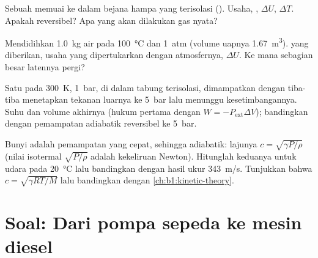 \begin{exercise}[$\star\star$]\label{exo:b1:first-law:9}
Sebuah  memuai ke dalam bejana hampa yang terisolasi (). Usaha, , $\Delta U$, $\Delta T$. Apakah 
reversibel? Apa yang akan dilakukan gas nyata?
\end{exercise}

\begin{exercise}[$\star\star\star$]\label{exo:b1:first-law:10}
Mendidihkan \qty{1.0}{kg} air pada \qty{100}{\degreeCelsius} dan \qty{1}{atm}
(volume uapnya \qty{1.67}{m^3}).  yang diberikan, usaha yang dipertukarkan dengan
atmosfernya, $\Delta U$. Ke mana sebagian besar  latennya pergi?
\end{exercise}

\begin{exercise}[$\star\star\star$]\label{exo:b1:first-law:11}
Satu   pada \qty{300}{K}, \qty{1}{bar}, di dalam tabung
terisolasi, dimampatkan dengan tiba-tiba menetapkan tekanan luarnya ke
\qty{5}{bar} lalu menunggu kesetimbangannya. Suhu dan volume akhirnya
(hukum pertama dengan $W = -P_{\mathrm{ext}}\Delta V$); bandingkan dengan pemampatan
adiabatik reversibel ke \qty{5}{bar}.
\end{exercise}

\begin{exercise}[$\star\star\star$]\label{exo:b1:first-law:12}
Bunyi adalah pemampatan yang cepat, sehingga adiabatik: lajunya $c = \sqrt{\gamma P/\rho}$
(nilai isotermal $\sqrt{P/\rho}$ adalah kekeliruan Newton). Hitunglah keduanya
untuk udara pada \qty{20}{\degreeCelsius} lalu bandingkan dengan hasil ukur
\qty{343}{m/s}. Tunjukkan bahwa $c = \sqrt{\gamma RT/M}$ lalu bandingkan dengan  \cref{ch:b1:kinetic-theory}.
\end{exercise}

\section{Soal: Dari pompa sepeda ke mesin diesel}

